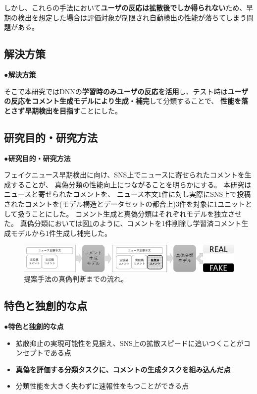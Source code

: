 {	しかし、これらの手法において\textbf{ユーザの反応は拡散後でしか得られない}ため、早期の検出を想定した場合は評価対象が制限され自動検出の性能が落ちてしまう問題がある。

	\subsection{解決方策}
	\noindent
	●\textbf{解決方策}

	そこで本研究ではDNNの\textbf{学習時のみユーザの反応を活用}し、テスト時は\textbf{ユーザの反応をコメント生成モデルにより生成・補完}して分類することで、
	\textbf{性能を落とさず早期検出を目指す}ことにした。

	\subsection{研究目的・研究方法}
	\noindent
	●\textbf{研究目的・研究方法}

	フェイクニュース早期検出に向け、SNS上でニュースに寄せられたコメントを生成することが、
	真偽分類の性能向上につながることを明らかにする。
	本研究はニュースと寄せられたコメントを、
	ニュース本文1件に対し実際にSNS上で投稿されたコメントを(モデル構造とデータセットの都合上)3件を対象に1ユニットとして扱うことにした。
	コメント生成と真偽分類はそれぞれモデルを独立させた。
	真偽分類においては図\ref{fig:model}のように、コメントを1件削除し学習済コメント生成モデルから1件生成し補完した。
	
	\begin{figure}[ht]
		\centering
		\includegraphics[width=0.95\linewidth]{figs/model.pdf}
		\vspace*{-3mm}
		\caption{提案手法の真偽判断までの流れ。}
		\label{fig:model}
	\end{figure}
	\vspace*{-4mm}
	\subsection{特色と独創的な点}
	\noindent
	●\textbf{特色と独創的な点}
	\vspace*{-3mm}
	\begin{itemize}
		\setlength{\parskip}{0cm}
		\setlength{\itemsep}{0cm}
		\item 拡散抑止の実現可能性を見据え、SNS上の拡散スピードに追いつくことがコンセプトである点
		\item \textbf{真偽を評価する分類タスクに、コメントの生成タスクを組み込んだ点}
		\item 分類性能を大きく失わずに速報性をもつことができる点
	\end{itemize}
	\vspace*{-2mm}

}
